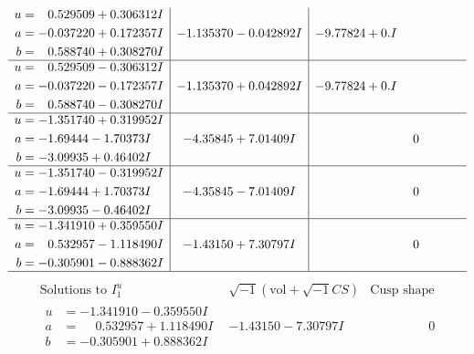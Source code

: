 \documentclass[1p]{elsarticle_modified}
\theoremstyle{definition}
\newcommand{\I}{\sqrt{-1}}
\begin{document}
$$\begin{array}{c|c|c}
\begin{aligned}
u &= \phantom{-}0.529509 + 0.306312 I \\
a &= -0.037220 + 0.172357 I \\
b &= \phantom{-}0.588740 + 0.308270 I\end{aligned}
 & -1.135370 - 0.042892 I & -9.77824 + 0. I\phantom{ +0.000000I} \\ \hline\begin{aligned}
u &= \phantom{-}0.529509 - 0.306312 I \\
a &= -0.037220 - 0.172357 I \\
b &= \phantom{-}0.588740 - 0.308270 I\end{aligned}
 & -1.135370 + 0.042892 I & -9.77824 + 0. I\phantom{ +0.000000I} \\ \hline\begin{aligned}
u &= -1.351740 + 0.319952 I \\
a &= -1.69444 - 1.70373 I \\
b &= -3.09935 + 0.46402 I\end{aligned}
 & -4.35845 + 7.01409 I & \phantom{-0.000000 } 0 \\ \hline\begin{aligned}
u &= -1.351740 - 0.319952 I \\
a &= -1.69444 + 1.70373 I \\
b &= -3.09935 - 0.46402 I\end{aligned}
 & -4.35845 - 7.01409 I & \phantom{-0.000000 } 0 \\ \hline\begin{aligned}
u &= -1.341910 + 0.359550 I \\
a &= \phantom{-}0.532957 - 1.118490 I \\
b &= -0.305901 - 0.888362 I\end{aligned}
 & -1.43150 + 7.30797 I & \phantom{-0.000000 } 0\\
 \hline 
 \end{array}$$\newpage$$\begin{array}{c|c|c}  
\text{Solutions to }I^u_{1}& \I (\text{vol} + \sqrt{-1}CS) & \text{Cusp shape}\\
 \hline 
\begin{aligned}
u &= -1.341910 - 0.359550 I \\
a &= \phantom{-}0.532957 + 1.118490 I \\
b &= -0.305901 + 0.888362 I\end{aligned}
 & -1.43150 - 7.30797 I & \phantom{-0.000000 } 0 \\ \hline\begin{aligned}

\end{aligned}
\end{array}$$
\end{document}
